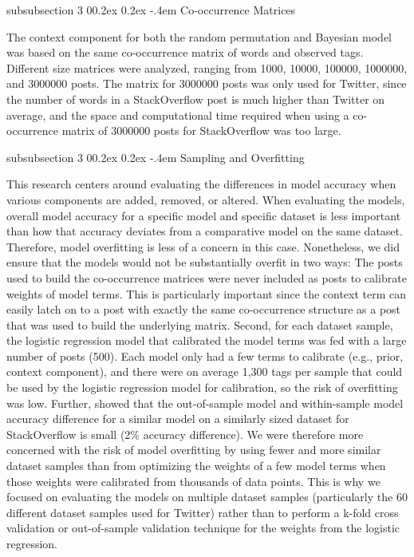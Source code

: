 \documentclass[man,floatsintext,donotrepeattitle]{apa6}
\makeatletter
\renewcommand{\subsubsection}{%
  \@startsection
  {subsubsection}%
  {3}%
  {\parindent}%
  {0\baselineskip \@plus 0.2ex \@minus 0.2ex}%
  {-.4em}%
  {\normalfont\normalsize\bfseries\addperi}}
\makeatother
\begin{document}
\subsubsection{Co-occurrence Matrices}

The context component for both the random permutation and Bayesian model was based on the same co-occurrence matrix of words and observed tags.
Different size matrices were analyzed, ranging from \num{1000}, \num{10000}, \num{100000}, \num{1000000}, and \num{3000000} posts.
The matrix for \num{3000000} posts was only used for Twitter, since the number of words in a StackOverflow post is much higher than Twitter on average,
and the space and computational time required when using a co-occurrence matrix of \num{3000000} posts for StackOverflow was too large. 

\subsubsection{Sampling and Overfitting}

This research centers around evaluating the differences in model accuracy when various components are added, removed, or altered.
When evaluating the models, overall model accuracy for a specific model and specific dataset is less important than how that accuracy deviates from a comparative model on the same dataset.
Therefore, model overfitting is less of a concern in this case. 
Nonetheless, we did ensure that the models would not be substantially overfit in two ways:
The posts used to build the co-occurrence matrices were never included as posts to calibrate weights of model terms.
This is particularly important since the context term can easily latch on to a post with exactly the same co-occurrence structure as a post that was used to build the underlying matrix.
Second, for each dataset sample, the logistic regression model that calibrated the model terms was fed with a large number of posts (500).
Each model only had a few terms to calibrate (e.g., prior, context component), and there were on average 1,300 tags per sample that could be used by the logistic regression model for calibration, so the risk of overfitting was low.
Further, \textcite{Stanley2013} showed that the out-of-sample model and within-sample model accuracy difference for a similar model on a similarly sized dataset for StackOverflow is small (2\% accuracy difference).
We were therefore more concerned with the risk of model overfitting by using fewer and more similar dataset samples than from optimizing the weights of a few model terms when those weights were calibrated from thousands of data points.
This is why we focused on evaluating the models on multiple dataset samples (particularly the 60 different dataset samples used for Twitter) rather than to perform a k-fold cross validation or out-of-sample validation technique for the weights from the logistic regression.
\end{document}
